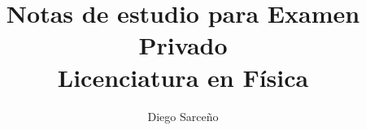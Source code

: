 \documentclass[11pt,dvipsnames]{report} %
\title{Notas de estudio para Examen Privado\\
Licenciatura en Física}
\author{Diego Sarceño}
\newcommand{\1}{\mathds{1}}
\begin{document}
\maketitle

\tableofcontents









%


%
%

\nocite{*}


\end{document}
